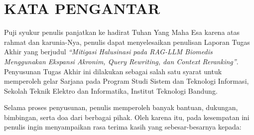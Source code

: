 \chapter*{KATA PENGANTAR}

Puji syukur penulis panjatkan ke hadirat Tuhan Yang Maha Esa karena atas rahmat dan karunia-Nya, penulis dapat menyelesaikan penulisan Laporan Tugas Akhir yang berjudul \textit{``Mitigasi Halusinasi pada RAG-LLM Biomedis Menggunakan Ekspansi Akronim, Query Rewriting, dan Context Reranking''}. Penyusunan Tugas Akhir ini dilakukan sebagai salah satu syarat untuk memperoleh gelar Sarjana pada Program Studi Sistem dan Teknologi Informasi, Sekolah Teknik Elektro dan Informatika, Institut Teknologi Bandung.

Selama proses penyusunan, penulis memperoleh banyak bantuan, dukungan, bimbingan, serta doa dari berbagai pihak. Oleh karena itu, pada kesempatan ini penulis ingin menyampaikan rasa terima kasih yang sebesar-besarnya kepada:

